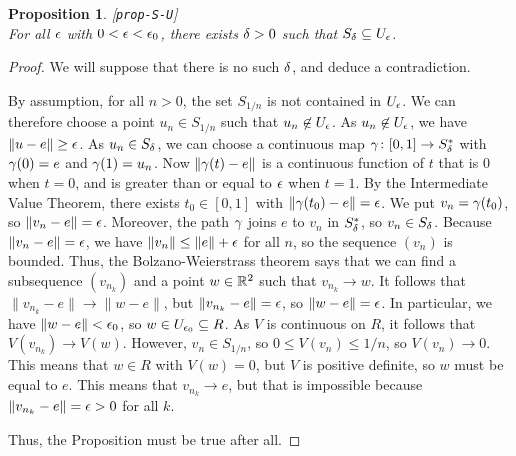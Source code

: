 \documentclass[reqno]{amsart}
\newcommand{\lbl}[1]{\label{#1}\textup{[\texttt{#1}]}\ \\}
\newcommand{\lbl}{\label}
\newtheorem{proposition}[theorem]{Proposition}
\theoremstyle{definition}
\begin{document}
\begin{proposition}\lbl{prop-S-U}
 For all $\epsilon$ with $0<\epsilon<\epsilon_0$, there exists $\delta>0$ such that
 $S_\delta\subseteq U_\epsilon$.
\end{proposition}
\begin{proof}
 We will suppose that there is no such $\delta$, and deduce a
 contradiction. 

 By assumption, for all $n>0$, the set $S_{1/n}$ is not contained in
 $U_\epsilon$.  We can therefore choose a point $u_n\in S_{1/n}$ such that
 $u_n\not\in U_\epsilon$.  As $u_n\not\in U_\epsilon$, we have
 $\|u-e\|\geq\epsilon$.  As $u_n\in S_\delta$, we can choose a continuous map
 $\gamma\colon[0,1]\to S_\delta^*$ with $\gamma(0)=e$ and $\gamma(1)=u_n$.  Now
 $\|\gamma(t)-e\|$ is a continuous function of $t$ that is $0$ when
 $t=0$, and is greater than or equal to $\epsilon$ when $t=1$.  By the
 Intermediate Value Theorem, there exists $t_0\in [0,1]$ with
 $\|\gamma(t_0)-e\|=\epsilon$.  We put $v_n=\gamma(t_0)$, so $\|v_n-e\|=\epsilon$.
 Moreover, the path $\gamma$ joins $e$ to $v_n$ in $S_\delta^*$, so
 $v_n\in S_\delta$.  Because $\|v_n-e\|=\epsilon$, we have
 $\|v_n\|\leq\|e\|+\epsilon$ for all $n$, so the sequence $(v_n)$ is
 bounded.  Thus, the Bolzano-Weierstrass theorem says that we can find
 a subsequence $(v_{n_k})$ and a point $w\in{\mathbb{R}}^2$ such that
 $v_{n_k}\to w$.  It follows that $\|v_{n_k}-e\|\to\|w-e\|$, but
 $\|v_{n_k}-e\|=\epsilon$, so $\|w-e\|=\epsilon$.  In particular, we have
 $\|w-e\|<\epsilon_0$, so $w\in U_{\epsilon_0}\subseteq R$.  As $V$ is continuous on
 $R$, it follows that $V(v_{n_k})\to V(w)$.  However,
 $v_n\in S_{1/n}$, so $0\leq V(v_n)\leq 1/n$, so $V(v_n)\to 0$.  This
 means that $w\in R$ with $V(w)=0$, but $V$ is positive definite, so
 $w$ must be equal to $e$.  This means that $v_{n_k}\to e$, but that
 is impossible because $\|v_{n_k}-e\|=\epsilon>0$ for all $k$.

 Thus, the Proposition must be true after all.
\end{proof}
\end{document}
